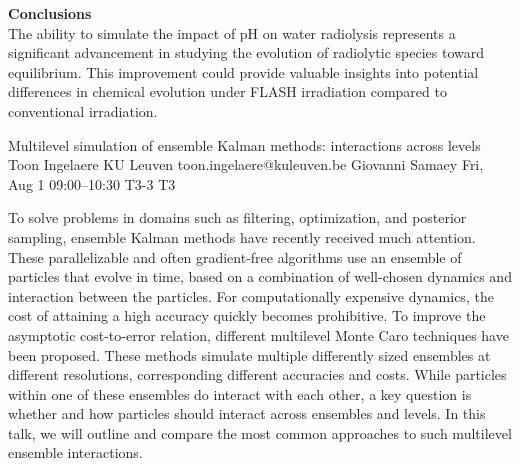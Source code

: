 \begin{talk}
\textbf{Conclusions}\\
The ability to simulate the impact of pH on water radiolysis represents a significant advancement in studying the evolution of radiolytic species toward equilibrium. This improvement could provide valuable insights into potential differences in chemical evolution under FLASH irradiation compared to conventional irradiation.


\medskip



\end{talk}

\begin{talk}
  {Multilevel simulation of ensemble Kalman methods: interactions across levels}%
  {Toon Ingelaere}%
  {KU Leuven}%
  {toon.ingelaere@kuleuven.be}%
  {Giovanni Samaey}%
  {}%
  {Fri, Aug 1 09:00–10:30}%
  {T3-3}%
  {T3}%
  
				

        To solve problems in domains such as filtering, optimization, and posterior sampling,
        ensemble Kalman methods have recently received much attention. These parallelizable and often gradient-free algorithms use an ensemble of particles that evolve in time, based on a combination of well-chosen dynamics and interaction between the particles. For computationally expensive dynamics, the cost of attaining a high accuracy quickly becomes prohibitive. To improve the asymptotic cost-to-error relation, different multilevel Monte Caro techniques have been proposed. These methods simulate multiple differently sized ensembles at different resolutions, corresponding different accuracies and costs. While particles within one of these ensembles do interact with each other, a key question is whether and how particles should interact across ensembles and levels.
        In this talk, we will outline and compare the most common approaches to such multilevel ensemble interactions.

\medskip

\end{talk}

